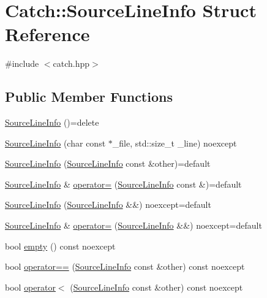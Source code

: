 \hypertarget{struct_catch_1_1_source_line_info}{}\section{Catch\+::Source\+Line\+Info Struct Reference}
\label{struct_catch_1_1_source_line_info}


{\ttfamily \#include $<$catch.\+hpp$>$}

\subsection*{Public Member Functions}
\begin{DoxyCompactItemize}
\item 
\mbox{\hyperlink{struct_catch_1_1_source_line_info_a2d80932bb4129b1606d1924a5c44be2f}{Source\+Line\+Info}} ()=delete
\item 
\mbox{\hyperlink{struct_catch_1_1_source_line_info_a48510b82a39a042ab370ed143dd30c10}{Source\+Line\+Info}} (char const $\ast$\+\_\+file, std\+::size\+\_\+t \+\_\+line) noexcept
\item 
\mbox{\hyperlink{struct_catch_1_1_source_line_info_a7c44c9986c33a9cf842b791374332d41}{Source\+Line\+Info}} (\mbox{\hyperlink{struct_catch_1_1_source_line_info}{Source\+Line\+Info}} const \&other)=default
\item 
\mbox{\hyperlink{struct_catch_1_1_source_line_info}{Source\+Line\+Info}} \& \mbox{\hyperlink{struct_catch_1_1_source_line_info_a1a6cfc0197357ef4e329bb256aa8a354}{operator=}} (\mbox{\hyperlink{struct_catch_1_1_source_line_info}{Source\+Line\+Info}} const \&)=default
\item 
\mbox{\hyperlink{struct_catch_1_1_source_line_info_a5ea6179645457b8ec961aec9ca4c5588}{Source\+Line\+Info}} (\mbox{\hyperlink{struct_catch_1_1_source_line_info}{Source\+Line\+Info}} \&\&) noexcept=default
\item 
\mbox{\hyperlink{struct_catch_1_1_source_line_info}{Source\+Line\+Info}} \& \mbox{\hyperlink{struct_catch_1_1_source_line_info_ab8469b89d86bdd69b6b9f2b610600258}{operator=}} (\mbox{\hyperlink{struct_catch_1_1_source_line_info}{Source\+Line\+Info}} \&\&) noexcept=default
\item 
bool \mbox{\hyperlink{struct_catch_1_1_source_line_info_a10a5b5b7dff82971879c2eb8d83f9b3b}{empty}} () const noexcept
\item 
bool \mbox{\hyperlink{struct_catch_1_1_source_line_info_af07e4fdeddf8409b91e4f842f6264cf8}{operator==}} (\mbox{\hyperlink{struct_catch_1_1_source_line_info}{Source\+Line\+Info}} const \&other) const noexcept
\item 
bool \mbox{\hyperlink{struct_catch_1_1_source_line_info_af77415416919d2d6030b4be085b92f7a}{operator$<$}} (\mbox{\hyperlink{struct_catch_1_1_source_line_info}{Source\+Line\+Info}} const \&other) const noexcept
\end{DoxyCompactItemize}
